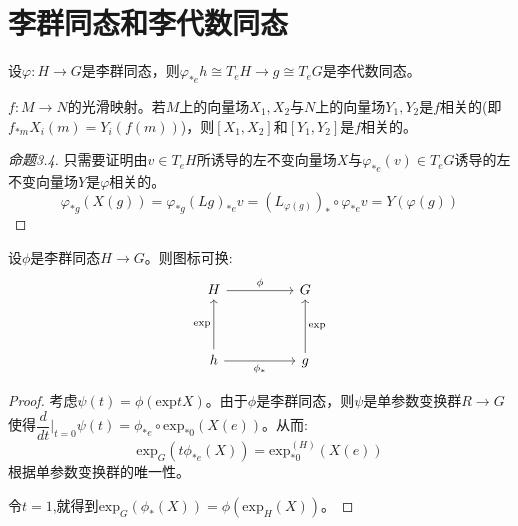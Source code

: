 \section{李群同态和李代数同态}
\begin{proposition}
    设$\varphi: H \to G$是李群同态，则$\varphi_{*e} h \cong T_eH \to g \cong T_e G$是李代数同态。
\end{proposition}
\begin{lemma}
    $f:M \to N$的光滑映射。若$M$上的向量场$X_1,X_2$与$N$上的向量场$Y_1,Y_2$是$f$相关的(即$f_{*m}X_i(m)=Y_i(f(m))$)，则$[X_1,X_2]$和$[Y_1,Y_2]$是$f$相关的。
\end{lemma}
\begin{proof}[命题3.4]
    只需要证明由$v \in T_eH$所诱导的左不变向量场$X$与$\varphi_{*e}(v) \in T_e G$诱导的左不变向量场$Y$是$\varphi$相关的。
    $$
    \varphi_{*g}(X(g))=\varphi_{*g}(Lg)_{*e}v=(L_{\varphi(g)})_* \circ \varphi_{*e}v=Y(\varphi(g))
    $$
\end{proof}
\begin{proposition}
    设$\phi$是李群同态$H \to G$。则图标可换:
\[\begin{tikzcd}
	H && G \\
	\\
	h && g
	\arrow["\phi", from=1-1, to=1-3]
	\arrow["{\mathrm{exp}}", from=3-1, to=1-1]
	\arrow["{\mathrm{exp}}"', from=3-3, to=1-3]
	\arrow["{\phi_*}"', from=3-1, to=3-3]
\end{tikzcd}\]
\end{proposition}
\begin{proof}
    考虑$\psi(t)=\phi(\mathrm{exp}tX)$。由于$\phi$是李群同态，则$\psi$是单参数变换群$R \to G$使得$\dfrac{d}{dt}|_{t=0} \psi(t)=\phi_{*e}\circ \mathrm{exp}_{*0}(X(e))$。从而:
    $$
    \mathrm{exp}_G(t\phi_{*e}(X))=\mathrm{exp}^{(H)}_{*0}(X(e))
    $$
    根据单参数变换群的唯一性。

    令$t=1$,就得到$\mathrm{exp}_G(\phi_*(X))=\phi(\mathrm{exp}_H(X))$。
\end{proof}

